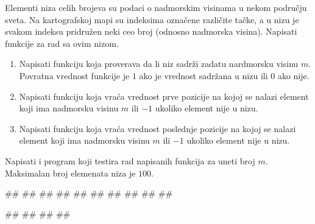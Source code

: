 \begin{Exercise}[label=v.nizovi_funkcije_razno] 
Elementi niza celih brojeva su podaci o nadmorskim visinama u nekom
području sveta.  Na kartografskoj mapi su indeksima označene različite
tačke, a u nizu je svakom indeksu pridružen neki ceo broj (odnosno
nadmorska visina). Napisati funkcije za rad sa ovim nizom.
\begin{enumerate}
\item Napisati funkciju koja proverava da li niz sadrži zadatu
  nardmorsku visinu $m$. Povratna vrednost funkcije je $1$ ako je
  vrednost sadržana u nizu ili $0$ ako nije.
\item Napisati funkciju koja vraća vrednost prve pozicije na kojoj se
  nalazi element koji ima nadmorsku visinu $m$ ili $-1$ ukoliko
  element nije u nizu.
\item Napisati funkciju koja vraća vrednost poslednje pozicije na
  kojoj se nalazi element koji ima nadmorsku visinu $m$ ili $-1$
  ukoliko element nije u nizu.
\end{enumerate}
Napisati i program koji testira rad napisanih funkcija za uneti broj
$m$. Maksimalan broj elemenata niza je $100$.

\begin{maxitest}
\begin{upotreba}{1}
#\naslovInt#
##
##
##
##
##
##
##
##
##
\end{upotreba}
\end{maxitest}

\begin{miditest}
\begin{upotreba}{2}
#\naslovInt#
##
##
##
\end{upotreba}
\end{miditest}
\end{Exercise}

\ifresenja
\begin{Answer}[ref=v.nizovi_funkcije_razno]
\end{Answer}
\fi

